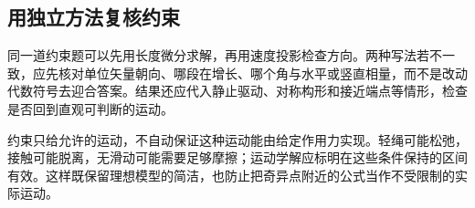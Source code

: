\subsection{用独立方法复核约束}
同一道约束题可以先用长度微分求解，再用速度投影检查方向。两种写法若不一致，应先核对单位矢量朝向、哪段在增长、哪个角与水平或竖直相量，而不是改动代数符号去迎合答案。结果还应代入静止驱动、对称构形和接近端点等情形，检查是否回到直观可判断的运动。

约束只给允许的运动，不自动保证这种运动能由给定作用力实现。轻绳可能松弛，接触可能脱离，无滑动可能需要足够摩擦；运动学解应标明在这些条件保持的区间有效。这样既保留理想模型的简洁，也防止把奇异点附近的公式当作不受限制的实际运动。

